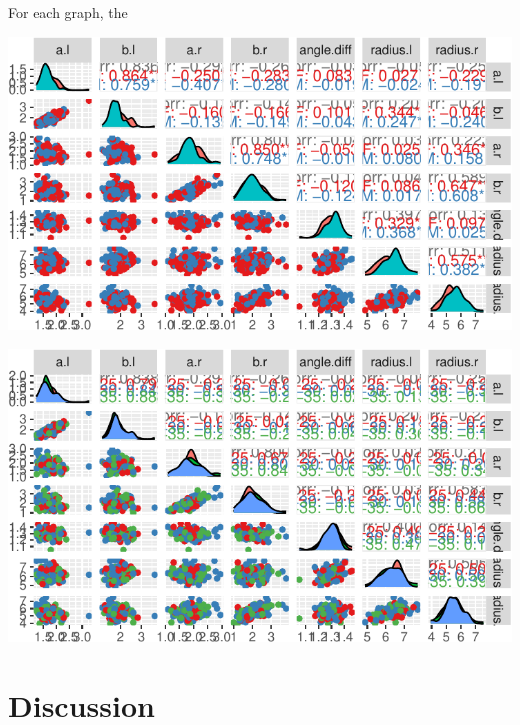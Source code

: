 \documentclass[
  11pt,
]{article}
\begin{document}
For each graph, the

\begin{center}\includegraphics{draft_files/figure-latex/hcp-gender-1} \end{center}

\begin{center}\includegraphics{draft_files/figure-latex/hcp-age-1} \end{center}

\hypertarget{discussion}{%
\section{Discussion}\label{discussion}}

\renewcommand\refname{Bibliography}
  
\end{document}
